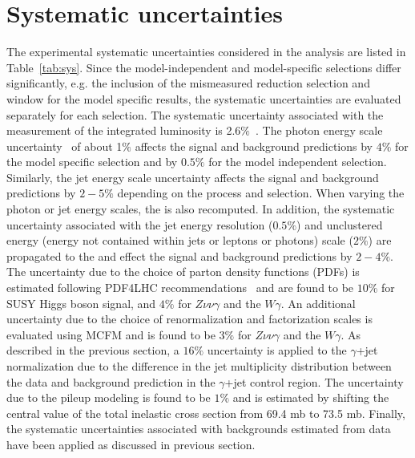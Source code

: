\section{Systematic uncertainties}

The experimental systematic uncertainties considered in the analysis are listed in Table~\ref{tab:sys}. Since the model-independent and model-specific selections differ significantly, e.g. the inclusion of the mismeasured \met reduction selection and \etg window for the model specific results, the systematic uncertainties are evaluated separately for each selection. The systematic uncertainty associated with the measurement of the integrated luminosity is 2.6$\%$~\cite{CMS:2013gfa}. The photon energy scale uncertainty~\cite{2014photon} of about 1$\%$ affects the signal and background predictions by $4\%$ for the model specific selection and by $0.5\%$ for the model independent selection.  Similarly, the jet energy scale uncertainty affects the signal and background predictions by $2-5\%$ depending on the process and selection.  When varying the photon or jet energy scales, the \met is also recomputed. In addition, the systematic uncertainty associated with the jet energy resolution ($0.5\%$) and unclustered energy (energy not contained within jets or leptons or photons) scale ($2\%$) are propagated to the \met and effect the signal and background predictions by $2-4\%$. The uncertainty due to the choice of parton density functions (PDFs) is estimated following PDF4LHC recommendations~\cite{PDF4LHC,PDF4LHC1,MSTW08LO} and are found to be $10\%$ for SUSY Higgs boson signal, and $4\%$ for $Z\nu\nu\gamma$ and the $W\gamma$. An additional uncertainty due to the choice of renormalization and factorization scales is evaluated using MCFM and is found to be $3\%$ for $Z\nu\nu\gamma$ and the $W\gamma$. As described in the previous section, a $16\%$ uncertainty is applied to the $\gamma$+jet normalization due to the difference in the jet multiplicity distribution between the data and background prediction in the  $\gamma$+jet control region. The uncertainty due to the pileup modeling is found to be $1\%$ and is estimated by shifting the central value of the total inelastic cross section from 69.4 mb to 73.5 mb. Finally, the systematic uncertainties associated with backgrounds estimated from data have been applied as discussed in previous section. 


